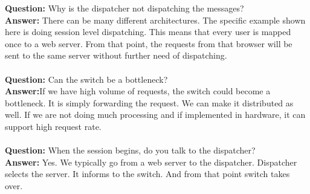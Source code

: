 \documentclass[twoside]{article}
\begin{document}
\textbf{Question:} Why is the dispatcher not dispatching the messages?\\
\textbf{Answer:} There can be many different architectures. The specific example shown here is doing session level dispatching. This means that every user is mapped once to a web server. From that point, the requests from that browser will be sent to the same server without further need of dispatching.\\\\
\textbf{Question:} Can the switch be a bottleneck?\\
\textbf{Answer:}If we have high volume of requests, the switch could become a bottleneck. It is simply forwarding the request. We can make it distributed as well. If we are not doing much processing and if implemented in hardware, it can support high request rate.\\\\
\textbf{Question:} When the session begins, do you talk to the dispatcher?\\
\textbf{Answer:} Yes. We typically go from a web server to the dispatcher. Dispatcher selects the server. It informs to the switch. And from that point switch takes over.
\end{document}
